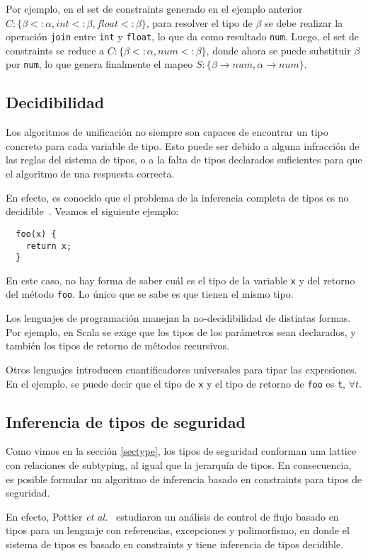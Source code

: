 Por ejemplo, en el set de constraints generado en el ejemplo anterior $C: \{\beta <: \alpha, int <: \beta, float <: \beta\}$, para resolver el tipo de $\beta$ se debe realizar la operación \texttt{join} entre \texttt{int} y \texttt{float}, lo que da como resultado \texttt{num}. Luego, el set de constraints se reduce a $C: \{\beta <: \alpha, num <: \beta\}$, donde ahora se puede substituir $\beta$ por \texttt{num}, lo que genera finalmente el mapeo $S: \{\beta \rightarrow num, \alpha \rightarrow num\}$.
\subsection{Decidibilidad}
Los algoritmos de unificación no siempre son capaces de encontrar un tipo concreto para cada variable de tipo. Esto puede ser debido a alguna infracción de las reglas del sistema de tipos, o a la falta de tipos declarados suficientes para que el algoritmo de una respuesta correcta.

En efecto, es conocido que el problema de la inferencia completa de tipos es no decidible~\cite{WELLS1999111}. Veamos el siguiente ejemplo:

\begin{lstlisting}
  foo(x) {
    return x;
  }
\end{lstlisting}

En este caso, no hay forma de saber cuál es el tipo de la variable \texttt{x} y del retorno del método \texttt{foo}. Lo único que se sabe es que tienen el mismo tipo.

Los lenguajes de programación manejan la no-decidibilidad de distintas formas. Por ejemplo, en Scala se exige que los tipos de los parámetros sean declarados, y también los tipos de retorno de métodos recursivos.

Otros lenguajes introducen cuantificadores universales para tipar las expresiones. En el ejemplo, se puede decir que el tipo de \texttt{x} y el tipo de retorno de \texttt{foo} es \texttt{t}, $\forall t$.
\subsection{Inferencia de tipos de seguridad}
Como vimos en la sección \ref{sectype}, los tipos de seguridad conforman una lattice con relaciones de subtyping, al igual que la jerarquía de tipos. En consecuencia, es posible formular un algoritmo de inferencia basado en constraints para tipos de seguridad.

En efecto, Pottier \textit{et al.}~\cite{Pottier} estudiaron un análisis de control de flujo basado en tipos para un lenguaje con referencias, excepciones y polimorfismo, en donde el sistema de tipos es basado en constraints y tiene inferencia de tipos decidible.
